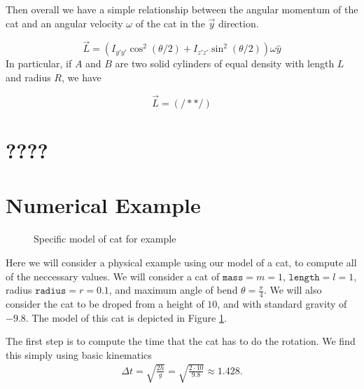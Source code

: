 \documentclass[12]{amsart}
\theoremstyle{definition}
\begin{document}
Then overall we have a simple relationship between the angular momentum of the cat and an angular velocity $\omega$ of the cat in the $\vec{y}$ direction.

\begin{equation}
  \vec{L} = (I_{y'y'} \cos^2(\theta/2) + I_{z'z'} \sin^2(\theta/2))\omega \hat{y}
\end{equation}
In particular, if $A$ and $B$ are two solid cylinders of equal density with length $L$ and radius $R$, we have

\begin{equation}
  \vec{L} = (/**/)
\end{equation}

\section{????}

\section{Numerical Example}%
\label{sec:numerical_example}

\begin{figure}[htpb]
  \centering
  
  \caption{Specific model of cat for example}%
  \label{fig:example_cat}
\end{figure}

Here we will consider a physical example using our model of a cat, to compute
all of the neccessary values. We will consider a cat of $\mathtt{mass}=m=1$,
$\mathtt{length}=l=1$, radius $\mathtt{radius}=r=0.1$, and maximum angle of
bend $\theta=\frac{\pi}{4}$. We will also consider the cat to be droped from a
height of $10$, and with standard gravity of $-9.8$. The model of this cat is
depicted in Figure \ref{fig:example_cat}.

The first step is to compute the time that the cat has to do the rotation. We
find this simply using basic kinematics
\begin{align*}
  \Delta t = \sqrt{\frac{2h}{g}}=\sqrt{\frac{2\cdot 10}{9.8}}\approx 1.428.
\end{align*}
\end{document}
